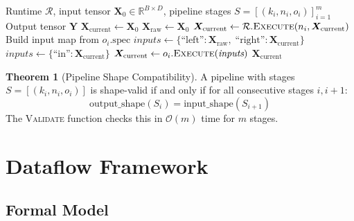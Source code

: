 \documentclass[11pt,a4paper,twoside]{article}
\theoremstyle{definition}
\newtheorem{theorem}{Theorem}[section]
\theoremstyle{remark}
\newcommand{\BigO}{\mathcal{O}}
\newcommand{\R}{\mathbb{R}}
\newcommand{\tensor}[1]{\bm{#1}}
\begin{document}
\begin{algorithm}[H]
\caption{\textsc{PipelineExecute}: Execute a composed program pipeline}
\label{alg:pipeline}
\begin{algorithmic}[1]
\Require Runtime $\mathcal{R}$, input tensor $\tensor{X}_0 \in \R^{B \times D}$, pipeline stages $S = [(k_i, n_i, o_i)]_{i=1}^{m}$
\Ensure Output tensor $\tensor{Y}$
\State $\tensor{X}_{\text{current}} \gets \tensor{X}_0$
\State $\tensor{X}_{\text{raw}} \gets \tensor{X}_0$ 
    \State $\tensor{X}_{\text{current}} \gets \mathcal{R}.\textsc{Execute}(n_i, \tensor{X}_{\text{current}})$ 
    \State Build input map from $o_i.\text{spec}$
      \State $\textit{inputs} \gets \{\text{``left''}: \tensor{X}_{\text{raw}},\; \text{``right''}: \tensor{X}_{\text{current}}\}$
    \Else
      \State $\textit{inputs} \gets \{\text{``in''}: \tensor{X}_{\text{current}}\}$
    \EndIf
    \State $\tensor{X}_{\text{current}} \gets o_i.\textsc{Execute}(\textit{inputs})$ 
  \EndIf
\EndFor
\State \Return $\tensor{X}_{\text{current}}$
\end{algorithmic}
\end{algorithm}

\begin{theorem}[Pipeline Shape Compatibility]
\label{thm:pipeline-valid}
A pipeline with stages $S = [(k_i, n_i, o_i)]$ is shape-valid if and only if for all consecutive stages $i, i+1$:
\begin{equation}
\text{output\_shape}(S_i) = \text{input\_shape}(S_{i+1})
\end{equation}
The \textsc{Validate} function checks this in $\BigO(m)$ time for $m$ stages.
\end{theorem}


\section{Dataflow Framework}
\label{sec:dataflow}

\subsection{Formal Model}
\end{document}
